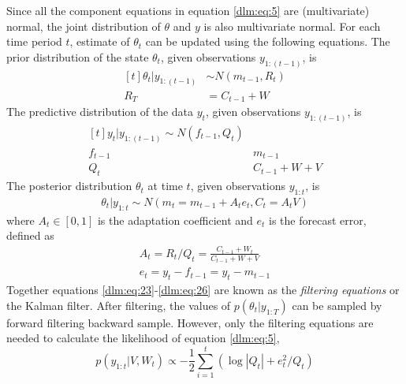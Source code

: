 Since all the component equations in equation \eqref{dlm:eq:5} are (multivariate) normal, the joint distribution of $\theta$ and $y$ is also multivariate normal.
For each time period $t$, estimate of $\theta_{t}$ can be updated using the following equations.
The prior distribution of the state $\theta_{t}$, given observations $y_{1:(t-1)}$, is
\begin{equation}
  \label{dlm:eq:23}
  \begin{aligned}[t]
    \theta_{t} | y_{1:(t-1)} & \sim N(m_{t-1}, R_{t}) \\
    R_{T} & = C_{t - 1} + W
  \end{aligned}
\end{equation}
The predictive distribution of the data $y_{t}$, given observations $y_{1:(t-1)}$, is
\begin{equation}
  \label{dlm:eq:25}
  \begin{aligned}[t]
    y_{t} | y_{1:(t-1)}  \sim N(f_{t-1}, Q_{t}) \\
    f_{t-1} & m_{t-1} \\
    Q_{t} & C_{t - 1} + W + V
  \end{aligned}
\end{equation}
The posterior distribution $\theta_{t}$ at time $t$, given observations $y_{1:t}$, is
\begin{equation}
  \label{dlm:eq:26}
  \begin{aligned}
    \theta_{t} | y_{1:t} \sim N(m_{t} = m_{t-1} + A_{t} e_{t}, C_{t} = A_{t} V)    
  \end{aligned}
\end{equation}
where $A_{t} \in [0, 1]$ is the adaptation coefficient and $e_{t}$ is the forecast error, defined as
\begin{align}
  \label{dlm:eq:30}
  A_{t} = R_{t} / Q_{t} = \frac{C_{t-1} + W_{t}}{C_{t-1} + W + V} \\
  e_{t} = y_{t} - f_{t-1} = y_{t} - m_{t-1}
\end{align}
Together equations \eqref{dlm:eq:23}-\eqref{dlm:eq:26} are known as the \textit{filtering equations} or the Kalman filter.
After filtering, the values of $p(\theta_{t} | y_{1:T})$ can be sampled by forward filtering backward sample.
However, only the filtering equations are needed to calculate the likelihood of equation \eqref{dlm:eq:5},
\begin{equation}
  \label{dlm:eq:27}
  p(y_{1:t} | V, W_{t}) \propto -\frac{1}{2} \sum_{i = 1}^{t}  \left( \log | Q_{t} |  + e_{t}^{2} / Q_{t} \right)
\end{equation}

